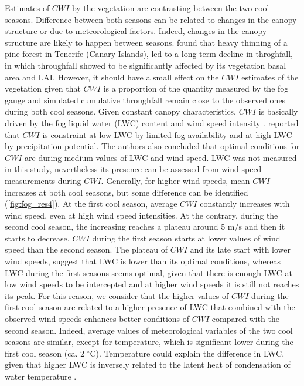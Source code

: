 \documentclass[a4paper,12pt]{article}
\begin{document}
\begin{linenumbers}
Estimates of $CWI$ by the vegetation are contrasting between the two cool seasons. Difference between both seasons can be related to changes in the canopy structure or due to meteorological factors. Indeed, changes in the canopy structure are likely to happen between seasons. \cite{Aboaletal2000} found that heavy thinning of a pine forest in Tenerife (Canary Islands), led to a long-term decline in throghfall, in which throughfall showed to be significantly affected by its vegetation basal area and LAI. However, it should have a small effect on the $CWI$ estimates of the vegetation given that $CWI$ is a proportion of the quantity measured by the fog gauge and simulated cumulative throughfall remain close to the observed ones during both cool seasons. Given constant canopy characteristics, $CWI$ is basically driven by the fog liquid water (LWC) content and wind speed intensity \citep{Villegasetal2008}. \cite{Villegasetal2008} reported that $CWI$ is constraint at low LWC by limited fog availability and at high LWC by precipitation potential. The authors also concluded that optimal conditions for $CWI$ are during medium values of LWC and wind speed. LWC was not measured in this study, nevertheless its presence can be assessed from wind speed measurements during $CWI$. Generally, for higher wind speeds, mean $CWI$ increases at both cool seasons, but some difference can be identified (\autoref{fig:fog_res4}). At the first cool season, average $CWI$ constantly increases with wind speed, even at high wind speed intensities. At the contrary, during the second cool season, the increasing reaches a plateau around 5 m/s and then it starts to decrease. $CWI$ during the first season starts at lower values of wind speed than the second season. The plateau of $CWI$ and its late start with lower wind speeds, suggest that LWC is lower than its optimal conditions, whereas LWC during the first seasons seems optimal, given that there is enough LWC at low wind speeds to be intercepted and at higher wind speeds it is still not reaches its peak. For this reason, we consider that the higher values of $CWI$ during the first cool season are related to a higher presence of LWC that combined with the observed wind speeds enhances better conditions of $CWI$ compared with the second season. Indeed, average values of meteorological variables of the two cool seasons are similar, except for temperature, which is significant lower during the first cool season (ca. $2$ $\mathrm{^{\circ}C}$). Temperature could explain the difference in LWC, given that higher LWC is inversely related to the latent heat of condensation of water temperature \citep{Thompson2007}.





\end{linenumbers}
\end{document}
